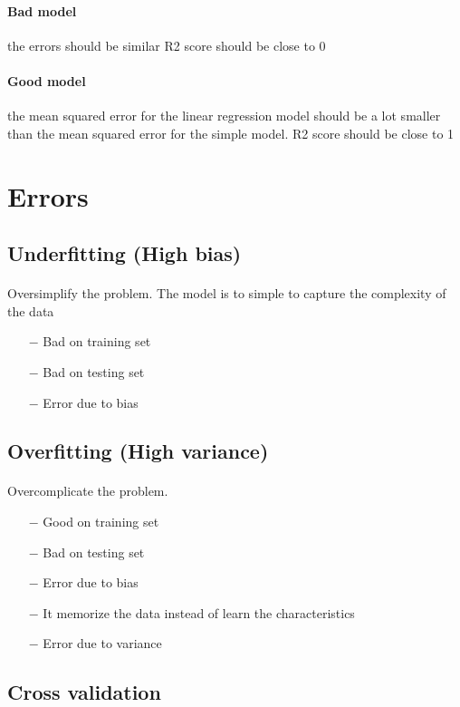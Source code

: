 \documentclass[]{article}
\begin{document}
\paragraph{Bad model} the errors should be similar R2 score should be close to 0
\paragraph{Good model} the mean squared error for the linear regression model should be a lot smaller than the mean squared error for the simple model. R2 score should be close to 1

\section{Errors}
\subsection{Underfitting (High bias)}
\paragraph{}Oversimplify the problem. The model is to simple to capture the complexity of the data
\begin{itemize}
	\item[$-$] Bad on training set
	\item[$-$] Bad on testing set
	\item[$-$] Error due to bias
\end{itemize}
\subsection{Overfitting (High variance)}
\paragraph{}Overcomplicate the problem.
\begin{itemize}
	\item[$-$] Good on training set
	\item[$-$] Bad on testing set
	\item[$-$] Error due to bias
	\item[$-$] It memorize the data instead of learn the characteristics
	\item[$-$] Error due to variance
\end{itemize}

\subsection{Cross validation}
\end{document}
